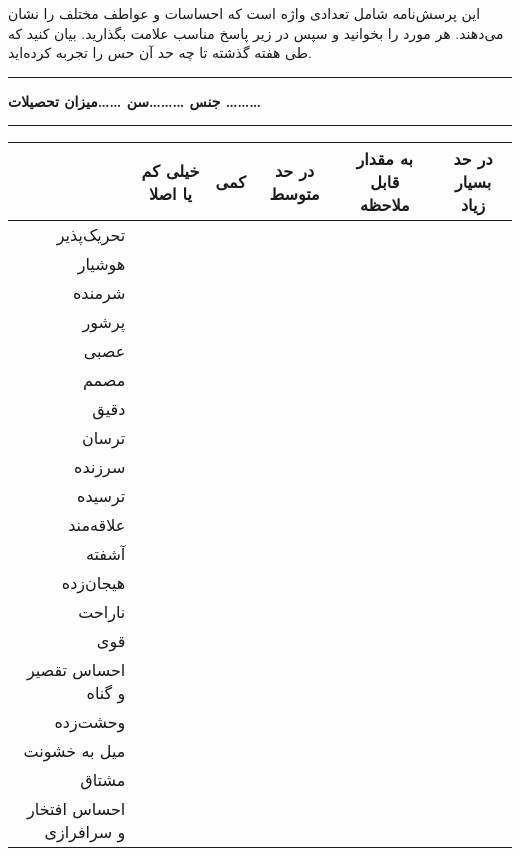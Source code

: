 \documentclass[a4paper,10pt]{article}
\begin{document}
 این پرسش‌نامه شامل تعدادی واژه است که احساسات و عواطف مختلف را نشان می‌دهند. هر مورد را بخوانید و سپس در زیر پاسخ مناسب علامت بگذارید.
بیان کنید که طی هفته گذشته تا چه حد آن حس را تجربه کرده‌اید.
\vspace{0.5cm}
\hrule
\vspace{0.25cm}
\begin{center}
\textbf{جنس \ldots \ldots \ldots سن \ldots \ldots میزان تحصیلات \ldots \ldots \ldots} 
\end{center}
\vspace{0.25cm}
\hrule
\vspace{0.25cm}



\begin{center}
\begin{tabular}{|r|c|c|c|c|c|}
\hline
 & خیلی کم یا اصلا & کمی & در حد متوسط & به مقدار قابل ملاحظه & در حد بسیار زیاد\\
\hline
تحریک‌پذیر &  &  &  &  & \\
\hline
هوشیار &  &  &  &  & \\
\hline
شرمنده &  &  &  &  & \\
\hline
پرشور &  &  &  &  & \\
\hline
عصبی &  &  &  &  & \\
\hline
مصمم &  &  &  &  & \\
\hline
دقیق &  &  &  &  & \\
\hline
ترسان &  &  &  &  & \\
\hline
سرزنده &  &  &  &  & \\
\hline
ترسیده &  &  &  &  & \\
\hline
علاقه‌مند &  &  &  &  & \\
\hline
آشفته &  &  &  &  & \\
\hline
هیجان‌زده &  &  &  &  & \\
\hline 
ناراحت &  &  &  &  & \\
\hline
قوی &  &  &  &  & \\
\hline
احساس تقصیر و گناه &  &  &  &  & \\
\hline
وحشت‌زده &  &  &  &  & \\
\hline
میل به خشونت &  &  &  &  & \\
\hline
مشتاق &  &  &  &  & \\
\hline
احساس افتخار و سرافرازی &  &  &  &  & \\
\hline

\end{tabular}
\end{center}
\end{document}
